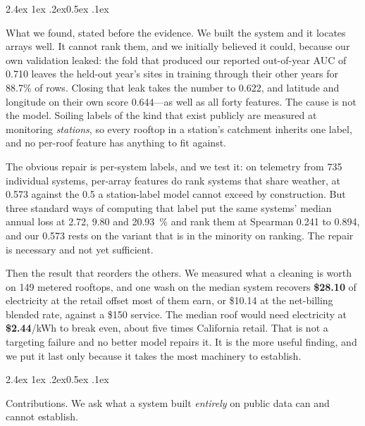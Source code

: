 \documentclass[10pt,twocolumn]{article}
\makeatletter
\renewcommand\paragraph{\@startsection{paragraph}{4}{\z@}%
  {2.4ex \@plus1ex \@minus.2ex}{0.5ex \@plus .1ex}%
  {\normalfont\normalsize\bfseries\raggedright}}
\makeatother
\begin{document}
\paragraph{What we found, stated before the evidence.}
We built the system and it locates arrays well. It cannot rank them, and we initially
believed it could, because our own validation leaked: the fold that produced our reported
out-of-year AUC of 0.710 leaves the held-out year's sites in training through their other
years for 88.7\% of rows. Closing that leak takes the number to 0.622, and latitude and
longitude on their own score 0.644---as well as all forty features. The cause is not the
model. Soiling labels of the kind that exist publicly are measured at monitoring
\emph{stations}, so every rooftop in a station's catchment inherits one label, and no
per-roof feature has anything to fit against.

The obvious repair is per-system labels, and we test it: on telemetry from 735 individual
systems, per-array features do rank systems that share weather, at 0.573 against the 0.5 a
station-label model cannot exceed by construction. But three standard ways of computing that label
put the same systems' median annual loss at 2.72, 9.80 and \SI{20.93}{\percent} and rank
them at Spearman 0.241 to 0.894, and our 0.573 rests on the variant that is in the
minority on ranking. The repair is necessary and not yet sufficient.

Then the result that reorders the others. We measured what a cleaning is worth on 149
metered rooftops, and one wash on the median system recovers \textbf{\$28.10} of
electricity at the retail offset most of them earn, or \$10.14 at the net-billing
blended rate, against a \$150 service. The median roof would need electricity at
\textbf{\$2.44}/kWh to break even, about five times California retail. That is not a
targeting failure and no better model repairs it. It is the more useful finding, and we
put it last only because it takes the most machinery to establish.

\paragraph{Contributions.}
We ask what a system built \emph{entirely} on public data can and cannot establish.
\end{document}
